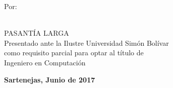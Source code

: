 
\begin{titlepage}
\begin{center}

\usbheader

\bigskip
\bigskip
\bigskip
\bigskip
\bigskip
\bigskip
\bigskip
\bigskip
\bigskip
\bigskip
\bigskip
\bigskip
\bigskip
\bigskip
\bigskip
\bigskip

\begin{minipage}{12cm}
\begin{center}
\textsc{\bfseries\uppercase{\projecttitle}}
\end{center}
\end{minipage}

\bigskip
\bigskip
\bigskip
\bigskip
\bigskip
\bigskip
\bigskip

\begin{minipage}{\textwidth}
\centering
Por: \\
\projectauthor \\

\end{minipage}

\bigskip
\bigskip
\bigskip
\bigskip
\bigskip
\bigskip
\bigskip
\bigskip
\bigskip

{PASANTÍA LARGA \\ Presentado ante la Ilustre Universidad Simón Bolívar \\
como requisito parcial para optar al título de \\ Ingeniero en Computación} \\

\bigskip
\bigskip
\vfill

{\large \bfseries Sartenejas, Junio de 2017}

\end{center}
\end{titlepage}
